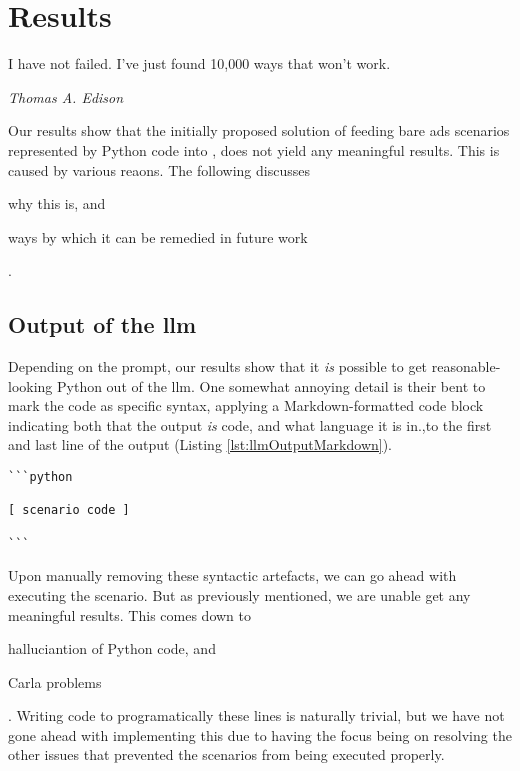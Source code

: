 \chapter{Results}\label{sec:results}

\epigraph{I have not failed. I've just found 10,000 ways that won't work.}{\textit{Thomas A. Edison}}

Our results show that the initially proposed solution of feeding bare
\acrshort{ads} scenarios represented by Python code into , does
not yield any meaningful results. This is caused by various reaons. The
following discusses \begin{inparaenum}
    \item why this is, and 
    \item ways by which it can be remedied in future work \end{inparaenum}.

\section{Output of the \acrshort{llm}}

Depending on the prompt, our results show that it \emph{is} possible to get
reasonable-looking Python out of the \acrshort{llm}. One somewhat annoying
detail is their bent to mark the code as specific syntax, applying a
Markdown-formatted code block indicating both that the output \emph{is} code,
and what language it is in.,to the first and last line of the output (Listing \ref{lst:llmOutputMarkdown}). 
\begin{lstlisting}[caption={\acrshort{llm}-generated Python code with Markdown syntax. The bracketed part on line 3 has been added for demonstration purposes, removing the actual code for brevity.}, label={lst:llmOutputMarkdown}]
```python

[ scenario code ]

```
\end{lstlisting}

Upon manually removing these syntactic artefacts, we can go ahead with executing
the scenario. But as previously mentioned, we are unable get any meaningful
results. This comes down to \begin{inparaenum}
    \item halluciantion of Python code, and 
    \item Carla problems
\end{inparaenum}. 
Writing code to programatically these lines is naturally trivial, but we have
not gone ahead with implementing this due to having the focus being on resolving
the other issues that prevented the scenarios from being executed properly.

